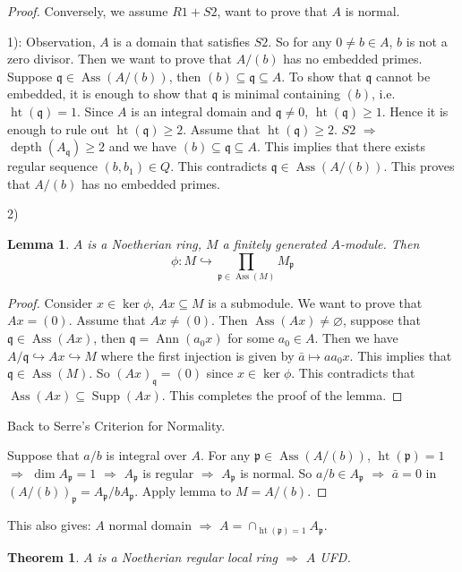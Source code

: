 \documentclass[cs4size]{article}
\newcommand{\su}{\subseteq}
\newcommand{\frp}{\mathfrak{p}}
\newcommand{\frq}{\mathfrak{q}}
\newcommand{\Ra}{\Rightarrow}
\DeclareMathOperator{\Ann}{Ann}
\DeclareMathOperator{\Supp}{Supp}
\DeclareMathOperator{\Ass}{Ass}
\DeclareMathOperator{\height}{ht}
\DeclareMathOperator{\depth}{depth}
\newtheorem{thm}{Theorem}
\newtheorem{lem}{Lemma}
\begin{document}
\begin{proof}
Conversely, we assume $R1+S2$, want to prove that $A$ is normal.

1): Observation, $A$ is a domain that satisfies $S2$. So for any $0\neq b\in A$, $b$ is not a zero divisor. Then we want to prove that $A/(b)$ has no embedded primes. Suppose $\frq\in\Ass(A/(b))$, then $(b)\su \frq\su A$. To show that $\frq$ cannot be embedded, it is enough to show that $\frq$ is minimal containing $(b)$, i.e. $\height (\frq)=1$. Since $A$ is an integral domain and $\frq\neq 0$, $\height (\frq)\geq 1$. Hence it is enough to rule out $\height(\frq)\geq 2$. Assume that $\height(\frq)\geq 2$. $S2$ $\Ra$ $\depth(A_\frq)\geq 2$ and we have $(b)\su \frq\su A$. This implies that there exists regular sequence $(b,b_1)\in Q$. This contradicts $\frq \in\Ass(A/(b))$. This proves that $A/(b)$ has no embedded primes.

2)\begin{lem}\label{lem:A}
$A$ is a Noetherian ring, $M$ a finitely generated $A$-module. Then \[\phi: M\hookrightarrow\prod_{\frp\in\Ass(M)}M_\frp\]
\end{lem}
\begin{proof}
Consider $x\in\ker\phi$, $Ax\su M$ is a submodule. We want to prove that $Ax=(0)$. Assume that $Ax\neq (0)$. Then $\Ass(Ax)\neq\varnothing$, suppose that $\frq\in\Ass(Ax)$, then $\frq=\Ann(a_0x)$ for some $a_0\in A$.  Then we have $A/\frq\hookrightarrow Ax\hookrightarrow M$ where the first injection is given by $\bar{a}\mapsto aa_0x$. This implies that $\frq\in\Ass(M)$. So $(Ax)_\frq=(0)$ since $x\in\ker\phi$. This contradicts that $\Ass(Ax)\su\Supp(Ax)$. This completes the proof of the lemma.
\end{proof}
Back to Serre's Criterion for Normality.

Suppose that $a/b$ is integral over $A$. For any $\frp\in\Ass(A/(b))$, $\height(\frp)=1$ $\Ra$ $\dim A_\frp=1$ $\Ra$ $ A_\frp$ is regular $\Ra$ $A_\frp$ is normal. So $a/b\in A_\frp$ $\Ra$ $\bar{a}=0$ in $(A/(b))_\frp=A_\frp/bA_\frp$. Apply lemma to $M=A/(b)$.
\end{proof}
This also gives: $A$ normal domain $\Ra$ $A=\cap_{\height (\frp)=1}A_\frp$.
\begin{thm}\label{lem:B}
$A$ is a Noetherian regular local ring $\Ra$ $A$ UFD.
\end{thm}
\end{document}
